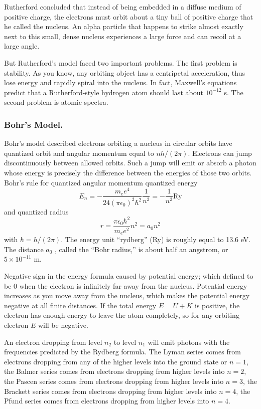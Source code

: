 \documentclass[../../../main.tex]{subfiles}
\begin{document}
Rutherford concluded that instead of being embedded in a diffuse medium of positive charge, the electrons must orbit about a tiny ball of positive charge that he called the nucleus. An alpha particle that happens to strike almost exactly next to this small, dense nucleus experiences a large force and can recoil at a large angle.

But Rutherford's model faced two important problems. The first problem is stability. As you know, any orbiting object has a centripetal acceleration, thus lose energy and rapidly spiral into the nucleus. In fact, Maxwell's equations predict that a Rutherford-style hydrogen atom should last about $10^{-12} $ s. The second problem is atomic spectra. 

\subsubsection{Bohr's Model.} Bohr's model described electrons orbiting a nucleus in circular orbits have quantized orbit and angular momentum equal to $nh/(2\pi)$. Electrons can jump discontinuously between allowed orbits. Such a jump will emit or absorb a photon whose energy is precisely the difference between the energies of those two orbits. Bohr's rule for quantized angular momentum quantized energy
\begin{equation*}
        E_n=-\frac{m_ee^4}{24(\pi\epsilon_0)^2\hbar^2}\frac{1}{n^2}=-\frac{1}{n^2}\text{Ry}
\end{equation*}
and quantized radius
\begin{equation*}
    r=\frac{\pi\epsilon_0\hbar^2}{m_ee^2}n^2=a_0n^2
\end{equation*}
with $\hbar=h/(2\pi)$. The energy unit “rydberg” (Ry) is roughly equal to 13.6 eV. The distance $a_0$ , called the “Bohr radius,” is about half an angstrom, or $5 \times 10^{-11}$ m. 

Negative sign in the energy formula caused by potential energy; which defined to be 0 when the electron is infinitely far away from the nucleus. Potential energy increases as you move away from the nucleus, which makes the potential energy negative at all finite distances. If the total energy $E = U + K$ is positive, the electron has enough energy to leave the atom completely, so for any orbiting electron $E$ will be negative. 

An electron dropping from level $n_2$ to level $n_1$ will emit photons with the frequencies predicted by the Rydberg formula. The Lyman series comes from electrons dropping from any of the higher levels into the ground state or $n=1$, the Balmer series comes from electrons dropping from higher levels into $n = 2$, the Pascen series comes from electrons dropping from higher levels into $n = 3$, the Brackett series comes from electrons dropping from higher levels into $n = 4$, the Pfund series comes from electrons dropping from higher levels into $n = 4$.
\end{document}
